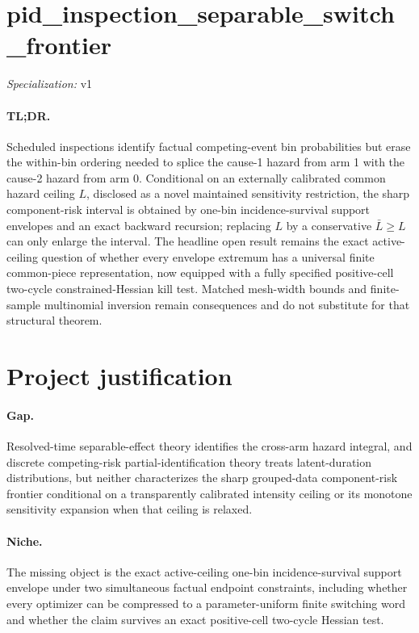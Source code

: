 \documentclass{article}
\begin{document}
\sloppy

\section*{pid\_\allowbreak{}inspection\_\allowbreak{}separable\_\allowbreak{}switch\_\allowbreak{}frontier}

\noindent\textit{Specialization:} v1\par

\paragraph{TL;DR.} Scheduled inspections identify factual competing-event bin probabilities but erase the within-bin ordering needed to splice the cause-1 hazard from arm 1 with the cause-2 hazard from arm 0. Conditional on an externally calibrated common hazard ceiling \(L\), disclosed as a novel maintained sensitivity restriction, the sharp component-risk interval is obtained by one-bin incidence-survival support envelopes and an exact backward recursion; replacing \(L\) by a conservative \(\bar L\ge L\) can only enlarge the interval. The headline open result remains the exact active-ceiling question of whether every envelope extremum has a universal finite common-piece representation, now equipped with a fully specified positive-cell two-cycle constrained-Hessian kill test. Matched mesh-width bounds and finite-sample multinomial inversion remain consequences and do not substitute for that structural theorem.

\section{Project justification}

\paragraph{Gap.} Resolved-time separable-effect theory identifies the cross-arm hazard integral, and discrete competing-risk partial-identification theory treats latent-duration distributions, but neither characterizes the sharp grouped-data component-risk frontier conditional on a transparently calibrated intensity ceiling or its monotone sensitivity expansion when that ceiling is relaxed.

\paragraph{Niche.} The missing object is the exact active-ceiling one-bin incidence-survival support envelope under two simultaneous factual endpoint constraints, including whether every optimizer can be compressed to a parameter-uniform finite switching word and whether the claim survives an exact positive-cell two-cycle Hessian test.
\end{document}
